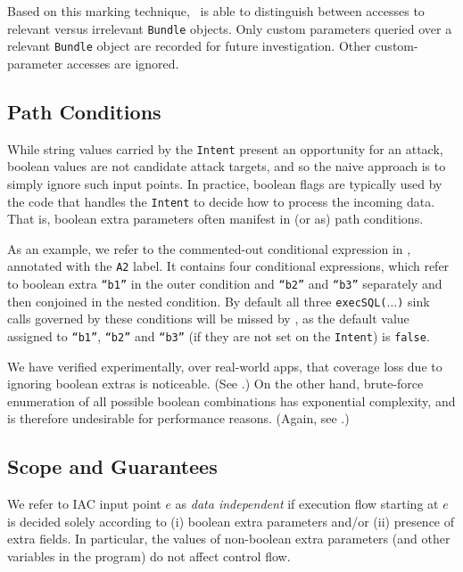 Based on this marking technique, \Tool\ is able to distinguish between accesses to relevant versus irrelevant {\tt Bundle} objects. Only custom parameters queried over a relevant {\tt Bundle} object are recorded for future investigation. Other custom-parameter accesses are ignored.

\subsection{Path Conditions}

While string values carried by the {\tt Intent} present an opportunity for an attack, boolean values are not candidate attack targets, and so the naive approach is to simply ignore such input points. In practice, boolean flags are typically used by the code that handles the {\tt Intent} to decide how to process the incoming data. That is, boolean extra parameters often manifest in (or as) path conditions.

As an example, we refer to the commented-out conditional expression in , annotated with the {\tt A2} label. It contains four conditional expressions, which refer to boolean extra {\tt ``b1''} in the outer condition and {\tt ``b2''} and {\tt ``b3''} separately and then conjoined in the nested condition. By default all three {\tt execSQL($\ldots$)} sink calls governed by these conditions will be missed by \Tool, as the default value assigned to {\tt ``b1''}, {\tt ``b2''} and {\tt ``b3''} (if they are not set on the {\tt Intent}) is {\tt false}. 

We have verified experimentally, over real-world apps, that coverage loss due to ignoring boolean extras is noticeable. (See .) On the other hand, 
brute-force enumeration of all possible boolean combinations has exponential complexity, and is therefore undesirable for performance reasons. (Again, see .) 

\subsection{Scope and Guarantees}

\begin{definition} We refer to IAC input point $e$ as \emph{data independent} if execution flow starting at $e$ is decided solely according to (i) boolean extra parameters and/or (ii) presence of extra fields. In particular, the values of non-boolean extra parameters (and other variables in the program) do not affect control flow.
\end{definition}

